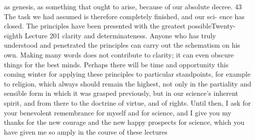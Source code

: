 as genesis, as something that ought to arise, because of our absolute decree. 43
The task we had assumed is therefore completely finished, and our sci-
ence has closed. The principles have been presented with the greatest possibleTwenty-eighth Lecture
201
clarity and determinateness. Anyone who has truly understood and penetrated
the principles can carry out the schematism on his own. Making many words
does not contribute to clarity; it can even obscure things for the best minds.
Perhaps there will be time and opportunity this coming winter for applying
these principles to particular standpoints, for example to religion, which
always should remain the highest, not only in the partiality and sensible form
in which it was grasped previously, but in our science’s inherent spirit, and
from there to the doctrine of virtue, and of rights. Until then, I ask for your
benevolent remembrance for myself and for science, and I give you my thanks
for the new courage and the new happy prospects for science, which you have
given me so amply in the course of these lectures
